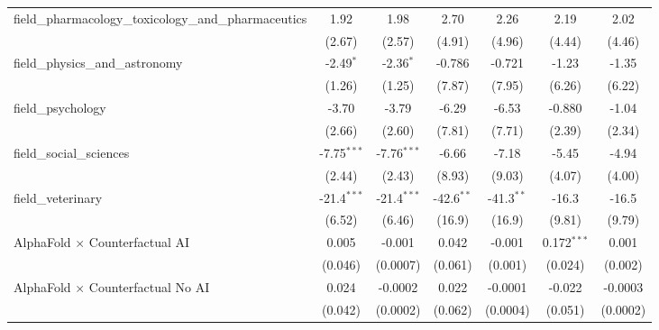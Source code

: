 \begin{tabular}{lcccccc}
   field\_pharmacology\_toxicology\_and\_pharmaceutics         & 1.92          & 1.98          & 2.70         & 2.26          & 2.19           & 2.02\\   
                                                               & (2.67)        & (2.57)        & (4.91)       & (4.96)        & (4.44)         & (4.46)\\   
   field\_physics\_and\_astronomy                              & -2.49$^{*}$   & -2.36$^{*}$   & -0.786       & -0.721        & -1.23          & -1.35\\   
                                                               & (1.26)        & (1.25)        & (7.87)       & (7.95)        & (6.26)         & (6.22)\\   
   field\_psychology                                           & -3.70         & -3.79         & -6.29        & -6.53         & -0.880         & -1.04\\   
                                                               & (2.66)        & (2.60)        & (7.81)       & (7.71)        & (2.39)         & (2.34)\\   
   field\_social\_sciences                                     & -7.75$^{***}$ & -7.76$^{***}$ & -6.66        & -7.18         & -5.45          & -4.94\\   
                                                               & (2.44)        & (2.43)        & (8.93)       & (9.03)        & (4.07)         & (4.00)\\   
   field\_veterinary                                           & -21.4$^{***}$ & -21.4$^{***}$ & -42.6$^{**}$ & -41.3$^{**}$  & -16.3          & -16.5\\   
                                                               & (6.52)        & (6.46)        & (16.9)       & (16.9)        & (9.81)         & (9.79)\\   
   AlphaFold $\times$ Counterfactual AI                        & 0.005         & -0.001        & 0.042        & -0.001        & 0.172$^{***}$  & 0.001\\   
                                                               & (0.046)       & (0.0007)      & (0.061)      & (0.001)       & (0.024)        & (0.002)\\   
   AlphaFold $\times$ Counterfactual No AI                     & 0.024         & -0.0002       & 0.022        & -0.0001       & -0.022         & -0.0003\\   
                                                               & (0.042)       & (0.0002)      & (0.062)      & (0.0004)      & (0.051)        & (0.0002)\\   

\end{tabular}
